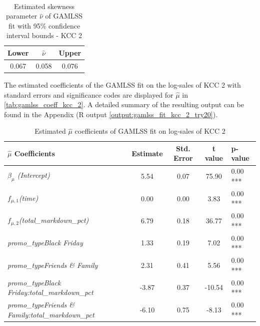 \begin{table}[H]
\setlength\arrayrulewidth{1pt}  
\centering
\begin{adjustbox}{max width=\textwidth}\
\begin{tabular}{c|c|c}
\hline
\rowcolor{white} 
\textbf{Lower} & $\hat{\nu}$ & \textbf{Upper} \\ \hline\hline
0.067        & 0.058           & 0.076        \\ \hline
\end{tabular}
\end{adjustbox}
\caption{Estimated skewness parameter $\hat{\nu}$ of GAMLSS fit with 95\% confidence interval bounds - KCC 2}
\label{tab:nu_ci_kcc_2}
\end{table}





The estimated coefficients of the \ac{GAMLSS} fit on the log-sales of \ac{KCC} 2 with standard errors and significance codes are displayed for $\hat{\mu}$ in \autoref{tab:gamlss_coeff_kcc_2}. A detailed summary of the resulting output can be found in the Appendix (R output \ref{output:gamlss_fit_kcc_2_try20}).
\\


\begin{table}[H]
\centering
\begin{tabular}{l|c|c|c|l}
  \hline
  \rowcolor{white}
 \textbf{$\hat{\mu}$ Coefficients} & \textbf{Estimate} & \textbf{Std. Error} & \textbf{t value} & \textbf{p-value} \\ 
  \hline\hline
\textit{$\beta_{\mu}$ (Intercept)} & 5.54 & 0.07 & 75.90 & 0.00 *** \\ 
  \textit{$f_{\mu, 1}$(time)} & 0.00 & 0.00 & 3.83 & 0.00 *** \\ 
  \textit{$f_{\mu ,2}$(total\_markdown\_pct)} & 6.79 & 0.18 & 36.77 & 0.00 *** \\ 
  \textit{promo\_typeBlack Friday} & 1.33 & 0.19 & 7.02 & 0.00 *** \\ 
  \textit{promo\_typeFriends \& Family} & 2.31 & 0.41 & 5.56 & 0.00 *** \\ 
  \textit{promo\_typeBlack Friday:total\_markdown\_pct} & -3.87 & 0.37 & -10.54 & 0.00 *** \\ 
  \textit{promo\_typeFriends \& Family:total\_markdown\_pct} & -6.10 & 0.75 & -8.13 & 0.00 *** \\ \hline
\end{tabular}
\caption{Estimated $\hat{\mu}$ coefficients of \ac{GAMLSS} fit on log-sales of \ac{KCC} 2}
\label{tab:gamlss_coeff_kcc_2}
\end{table}

